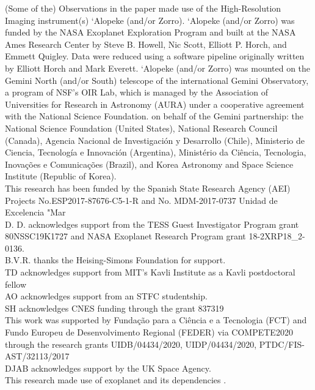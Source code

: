 \documentclass[fleqn,usenatbib]{mnras}
\begin{document}
(Some of the) Observations in the paper made use of the High-Resolution Imaging instrument(s) ‘Alopeke (and/or Zorro). ‘Alopeke (and/or Zorro) was funded by the NASA Exoplanet Exploration Program and built at the NASA Ames Research Center by Steve B. Howell, Nic Scott, Elliott P. Horch, and Emmett Quigley. Data were reduced using a software pipeline originally written by Elliott Horch and Mark Everett. ‘Alopeke (and/or Zorro) was mounted on the Gemini North (and/or South) telescope of the international Gemini Observatory, a program of NSF’s OIR Lab, which is managed by the Association of Universities for Research in Astronomy (AURA) under a cooperative agreement with the National Science Foundation. on behalf of the Gemini partnership: the National Science Foundation (United States), National Research Council (Canada), Agencia Nacional de Investigación y Desarrollo (Chile), Ministerio de Ciencia, Tecnología e Innovación (Argentina), Ministério da Ciência, Tecnologia, Inovações e Comunicações (Brazil), and Korea Astronomy and Space Science Institute (Republic of Korea).\\ %
This research has been funded by the Spanish State Research Agency (AEI) Projects No.ESP2017-87676-C5-1-R and No. MDM-2017-0737 Unidad de Excelencia "Mar\\ %
D. D. acknowledges support from the TESS Guest Investigator Program grant 80NSSC19K1727 and NASA Exoplanet Research Program grant 18-2XRP18\_2-0136.\\ %
B.V.R. thanks the Heising-Simons Foundation for support.\\ %
TD acknowledges support from MIT's Kavli Institute as a Kavli postdoctoral fellow\\ %
AO acknowledges support from an STFC studentship.\\ %
SH acknowledges CNES funding through the grant 837319\\ %
This work was supported by Fundação para a Ciência e a Tecnologia (FCT) and Fundo Europeu de Desenvolvimento Regional (FEDER) via COMPETE2020 through the research grants UIDB/04434/2020, UIDP/04434/2020, PTDC/FIS-AST/32113/2017 \\ %
DJAB acknowledges support by the UK Space Agency.\\ %
This research made use of \textsf{exoplanet} \citep{exoplanet:exoplanet} and its
dependencies \citep{exoplanet:agol19, exoplanet:astropy13, exoplanet:astropy18,
exoplanet:exoplanet, exoplanet:foremanmackey17, exoplanet:foremanmackey18,
exoplanet:luger18, exoplanet:pymc3, exoplanet:theano}.
\end{document}
